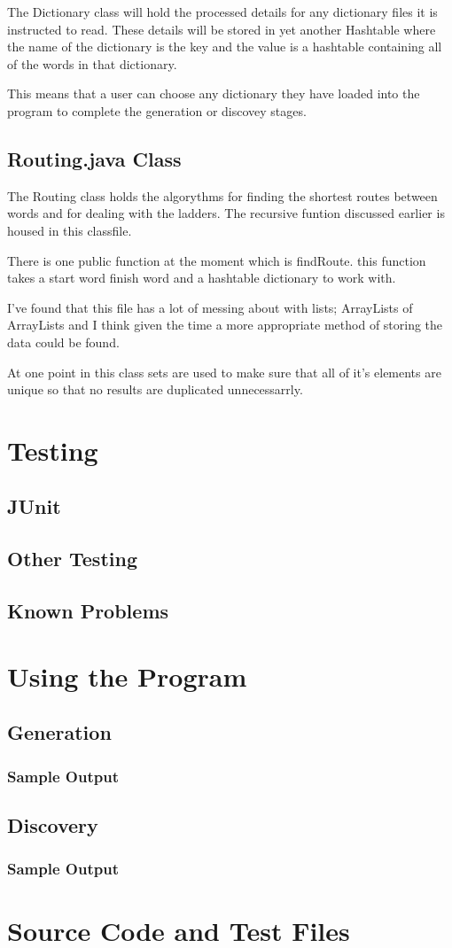 \documentclass[final,a4paper,twoside,12pt]{report}
\begin{document}
The Dictionary class will hold the processed details for any
dictionary files it is instructed to read. These details will be
stored in yet another Hashtable where the name of the dictionary
is the key and the value is a hashtable containing all of the
words in that dictionary.

This means that a user can choose any dictionary they have loaded
into the program to complete the generation or discovey stages. 
\subsection{Routing.java Class}
The Routing class holds the algorythms for finding the shortest
routes between words and for dealing with the ladders. The recursive
funtion discussed earlier is housed in this classfile.

There is one public function at the moment which is findRoute.
this function takes a start word finish word and a hashtable 
dictionary to work with.

I've found that this file has a lot of messing about with lists;
ArrayLists of ArrayLists and I think given the time a more appropriate
method of storing the data could be found.

At one point in this class sets are used to make sure that all 
of it's elements are unique so that no results are duplicated
unnecessarrly.

\section{Testing}
\subsection{JUnit}
\subsection{Other Testing}
\subsection{Known Problems}

\section{Using the Program}
\subsection{Generation}
\subsubsection{Sample Output}
\subsection{Discovery}
\subsubsection{Sample Output}

\section{Source Code and Test Files}
\end{document}
